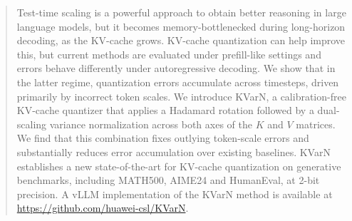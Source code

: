 \documentclass{article}
\newcommand{\methodname}{KVarN\xspace}
\begin{document}
\begin{abstract}
Test-time scaling is a powerful approach to obtain better reasoning in large language models, but it becomes memory-bottlenecked during long-horizon decoding, as the KV-cache grows. KV-cache quantization can help improve this, but current methods are evaluated under prefill-like settings and errors behave differently under autoregressive decoding. We show that in the latter regime, quantization errors accumulate across timesteps, driven primarily by incorrect token scales. We introduce KVarN, a calibration-free KV-cache quantizer that applies a Hadamard rotation followed by a dual-scaling variance normalization across both axes of the $K$ and $V$ matrices. We find that this combination fixes outlying token-scale errors and substantially reduces error accumulation over existing baselines. KVarN establishes a new state-of-the-art for KV-cache quantization on generative benchmarks, including MATH500, AIME24 and HumanEval, at 2-bit precision. A vLLM implementation of the KVarN method is available at \url{https://github.com/huawei-csl/KVarN}.

\end{abstract}
\end{document}
